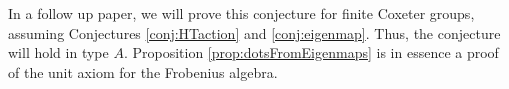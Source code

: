 In a follow up paper, we will prove this conjecture for finite Coxeter groups, assuming Conjectures \ref{conj:HTaction} and \ref{conj:eigenmap}. Thus, the conjecture will hold in type
$A$. Proposition \ref{prop:dotsFromEigenmaps} is in essence a proof of the unit axiom for the Frobenius algebra.



